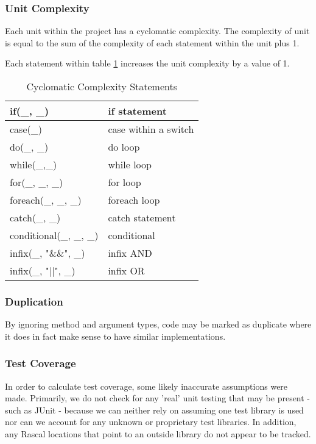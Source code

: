 \documentclass{article}
\begin{document}
\subsubsection{Unit Complexity}
Each unit within the project has a cyclomatic complexity. The complexity of unit is equal to the  sum of the complexity of each statement within the unit plus 1.

Each statement within table \ref{complexityvalues} increases the unit complexity by a value of 1.

\begin{table}[h!tbp]
	\caption{Cyclomatic Complexity Statements}
	\label{complexityvalues}
	\begin{tabular}{l|l}	
		\hline
		if(\_, \_)					&			if statement \\
		\hline
		case(\_)					&			case within a switch \\
		\hline
		do(\_, \_)					&			do loop \\
		\hline
		while(\_,\_)				&			while loop \\
		\hline
		for(\_, \_, \_)				&			for loop \\
		\hline
		foreach(\_, \_, \_)			&			foreach loop \\
		\hline
		catch(\_, \_)				&			catch statement \\
		\hline
		conditional(\_, \_, \_)		&			conditional \\
		\hline
		infix(\_, "\&\&", \_)		&			infix AND \\
		\hline
		infix(\_, "\(||\)", \_)		&			infix OR \\
		\hline
	\end{tabular}
\end{table}

\subsubsection{Duplication}
By ignoring method and argument types, code may be marked as duplicate where it does in fact make sense to have similar implementations.

\subsubsection{Test Coverage} \label{assumetests}
In order to calculate test coverage, some likely inaccurate assumptions were made.
Primarily, we do not check for any 'real' unit testing that may be present - such as JUnit - because we can neither rely on assuming one test library is used nor can we account for any unknown or proprietary test libraries. In addition, any Rascal locations that point to an outside library do not appear to be tracked.
\end{document}
